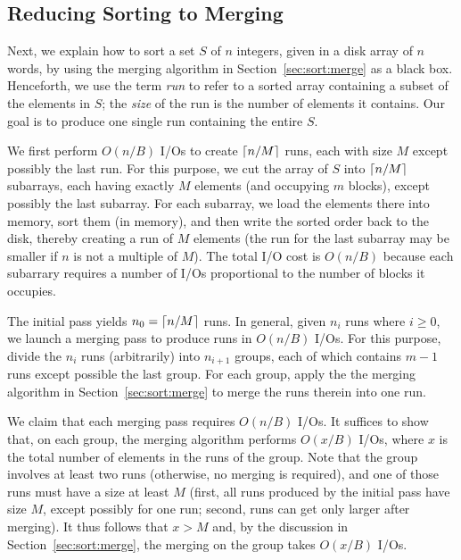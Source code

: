 \subsection{Reducing Sorting to Merging} \label{sec:sort:sort}

Next, we explain how to sort a set $S$ of $n$ integers, given in a disk array of $n$ words, by using the merging algorithm in Section~\ref{sec:sort:merge} as a black box. Henceforth, we use the term {\em run} to refer to a sorted array containing a subset of the elements in $S$; the {\em size} of the run is the number of elements it contains. Our goal is to produce one single run containing the entire $S$.

 We first perform $O(n/B)$ I/Os to create $\left \lceil n/M \right \rceil$ runs, each with size $M$ except possibly the last run. For this purpose, we cut the array of $S$ into $\left \lceil n/M \right \rceil$ subarrays, each having exactly $M$ elements (and occupying $m$ blocks), except possibly the last subarray. For each subarray, we load the elements there into memory, sort them (in memory), and then write the sorted order back to the disk, thereby creating a run of $M$ elements (the run for the last subarray may be smaller if $n$ is not a multiple of $M$). The total I/O cost is $O(n/B)$ because each subarrary requires a number of I/Os proportional to the number of blocks it occupies.

 The initial pass yields $n_0 = \left \lceil n/M \right \rceil$ runs. In general, given $n_i$ runs where $i \ge 0$, we launch a merging pass to produce
runs in $O(n/B)$ I/Os. For this purpose, divide the $n_i$ runs (arbitrarily) into $n_{i+1}$ groups, each of which contains $m-1$ runs except possible the last group. For each group, apply the the merging algorithm in Section~\ref{sec:sort:merge} to merge the runs therein into one run.

\vgap

We claim that each merging pass requires $O(n/B)$ I/Os. It suffices to show that, on each group, the merging algorithm performs $O(x/B)$ I/Os, where $x$ is the total number of elements in the runs of the group. Note that the group involves at least two runs (otherwise, no merging is required), and one of those runs must have a size at least $M$ (first, all runs produced by the initial pass have size $M$, except possibly for one run; second, runs can get only larger after merging). It thus follows that $x > M$ and, by the discussion in Section~\ref{sec:sort:merge}, the merging on the group takes $O(x/B)$ I/Os.

